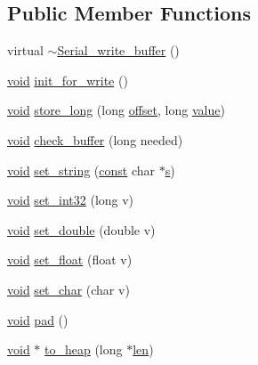 \subsection*{Public Member Functions}
\begin{DoxyCompactItemize}
\item 
virtual \hyperlink{class_serial__write__buffer_a0f9b2434324cdecb8152ab092c9698c7}{$\sim$\+Serial\+\_\+write\+\_\+buffer} ()
\item 
\hyperlink{sound_8c_ae35f5844602719cf66324f4de2a658b3}{void} \hyperlink{class_serial__write__buffer_a6ca958e178ed18486a2e99082180e818}{init\+\_\+for\+\_\+write} ()
\item 
\hyperlink{sound_8c_ae35f5844602719cf66324f4de2a658b3}{void} \hyperlink{class_serial__write__buffer_af73d0469f6c9cc332f7d38d6d0ab3db6}{store\+\_\+long} (long \hyperlink{layer12_8c_a33d71f23ba2052d17f0b754dc35265b0}{offset}, long \hyperlink{lib_2expat_8h_a4a30a13b813682e68c5b689b45c65971}{value})
\item 
\hyperlink{sound_8c_ae35f5844602719cf66324f4de2a658b3}{void} \hyperlink{class_serial__write__buffer_a0426182fe619c3912835837443e653f8}{check\+\_\+buffer} (long needed)
\item 
\hyperlink{sound_8c_ae35f5844602719cf66324f4de2a658b3}{void} \hyperlink{class_serial__write__buffer_a801c1478f0230e0db6573f58a1777894}{set\+\_\+string} (\hyperlink{getopt1_8c_a2c212835823e3c54a8ab6d95c652660e}{const} char $\ast$\hyperlink{lib_2expat_8h_a755339d27872b13735c2cab829e47157}{s})
\item 
\hyperlink{sound_8c_ae35f5844602719cf66324f4de2a658b3}{void} \hyperlink{class_serial__write__buffer_a9ed1e1a2220140daf9a7093b400e82c1}{set\+\_\+int32} (long v)
\item 
\hyperlink{sound_8c_ae35f5844602719cf66324f4de2a658b3}{void} \hyperlink{class_serial__write__buffer_ab37fa1f1362845cf5b7c81da66322ab1}{set\+\_\+double} (double v)
\item 
\hyperlink{sound_8c_ae35f5844602719cf66324f4de2a658b3}{void} \hyperlink{class_serial__write__buffer_ad9ac29b1a160be3815ca291587ef2e11}{set\+\_\+float} (float v)
\item 
\hyperlink{sound_8c_ae35f5844602719cf66324f4de2a658b3}{void} \hyperlink{class_serial__write__buffer_a946df4a6990e7db400ddc0ad3fdf2b1a}{set\+\_\+char} (char v)
\item 
\hyperlink{sound_8c_ae35f5844602719cf66324f4de2a658b3}{void} \hyperlink{class_serial__write__buffer_a20c307df22c40fa430b7a96301e3957e}{pad} ()
\item 
\hyperlink{sound_8c_ae35f5844602719cf66324f4de2a658b3}{void} $\ast$ \hyperlink{class_serial__write__buffer_af2a849c889a3afc389b1dff0b66eed39}{to\+\_\+heap} (long $\ast$\hyperlink{lib_2expat_8h_af86d325fecfc8f47b61fbf5a5146f582}{len})
\end{DoxyCompactItemize}

